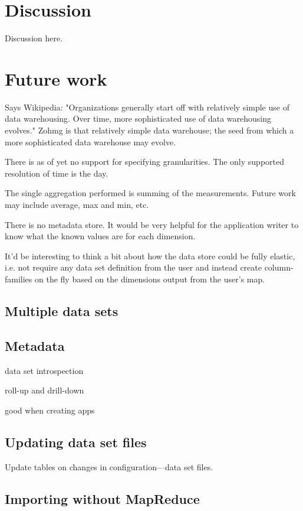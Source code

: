 \section{Discussion}

Discussion here.


\section{Future work}

Says Wikipedia: "Organizations generally start off with relatively simple use
of data warehousing. Over time, more sophisticated use of data warehousing
evolves." Zohmg is that relatively simple data warehouse; the seed from which
a more sophisticated data warehouse may evolve.

There is as of yet no support for specifying granularities. The only supported
resolution of time is the day.

The single aggregation performed is summing of the measurements. Future work
may include average, max and min, etc.

There is no metadata store. It would be very helpful for the application
writer to know what the known values are for each dimension.

It'd be interesting to think a bit about how the data store could be fully
elastic, i.e. not require any data set definition from the user and instead
create column-families on the fly based on the dimensions output from the
user's map.


\subsection{Multiple data sets}


\subsection{Metadata}

data set introspection

roll-up and drill-down

good when creating apps


\subsection{Updating data set files}

Update tables on changes in configuration---data set files.


\subsection{Importing without MapReduce}

